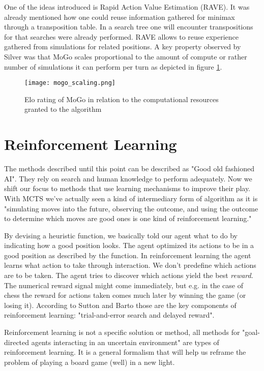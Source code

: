 One of the ideas introduced is Rapid Action Value Estimation (RAVE). It was already mentioned how one could reuse information gathered for minimax through a transposition table. In a search tree one will encounter transpositions for that searches were already performed. RAVE allows to reuse experience gathered from simulations for related positions. A key property observed by Silver was that MoGo scales proportional to the amount of compute or rather number of simulations it can perform per turn as depicted in figure \ref{mogo_scaling}.

\begin{figure}
    \centering
    \texttt{[image: mogo\_scaling.png]}
    \caption{Elo rating of MoGo in relation to the computational resources granted to the algorithm \cite[p. 1872]{gelly_monte-carlo_2011}}
    \label{mogo_scaling}
\end{figure}

\section{Reinforcement Learning}
The methods described until this point can be described as "Good old fashioned AI". They rely on search and human knowledge to perform adequately. Now we shift our focus to methods that use learning mechanisms to improve their play. With MCTS we've actually seen a kind of intermediary form of algorithm as it is "simulating moves into the future, observing the outcome, and using the outcome to determine which moves are good ones is one kind of reinforcement learning." \cite[p. 331]{russell_artificial_2021}

By devising a heuristic function, we basically told our agent what to do by indicating how a good position looks. The agent optimized its actions to be in a good position as described by the function. In reinforcement learning the agent learns what action to take through interaction. We don't predefine which actions are to be taken. The agent tries to discover which actions yield the best \textit{reward}. The numerical reward signal might come immediately, but e.g. in the case of chess the reward for actions taken comes much later by winning the game (or losing it). According to Sutton and Barto those are the key components of reinforcement learning: "trial-and-error search and delayed reward". \cite[p. 1]{sutton_reinforcement_2018}

Reinforcement learning is not a specific solution or method, all methods for "goal-directed agents interacting in an uncertain environment" \cite[p. 3]{sutton_reinforcement_2018} are types of reinforcement learning. It is a general formalism that will help us reframe the problem of playing a board game (well) in a new light.

